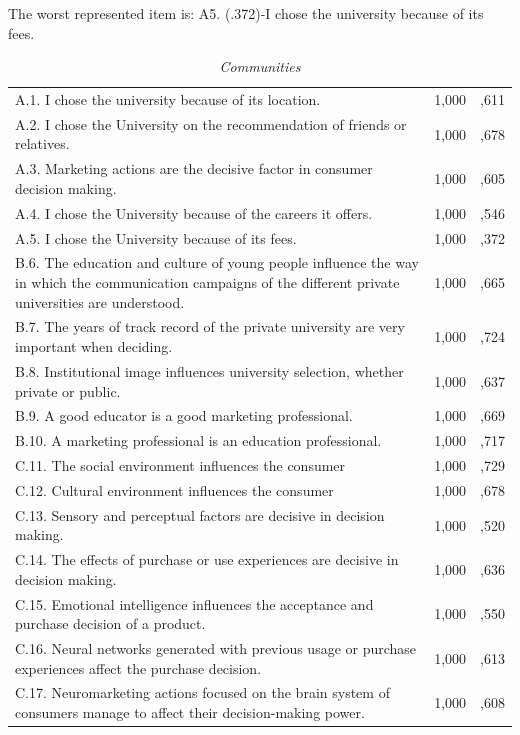 \documentclass[english]{textolivre}
\begin{document}
The worst represented item is: A5. (.372)-I chose the university because of its fees.

\begin{table}[h!]
\small
\centering
\caption{\textit{Communities}}
\begin{tabular}{p{}ll}
\toprule
A.1. I chose the university because of its location. & 1,000 & ,611 \\
A.2. I chose the University on the recommendation of friends or relatives. & 1,000 & ,678 \\
A.3. Marketing actions are the decisive factor in consumer decision making. & 1,000 & ,605 \\
A.4. I chose the University because of the careers it offers. & 1,000 & ,546 \\
A.5. I chose the University because of its fees. & 1,000 & ,372 \\
B.6. The education and culture of young people influence the way in which the communication campaigns of the different private universities are understood. & 1,000 & ,665 \\
B.7. The years of track record of the private university are very important when deciding. & 1,000 & ,724 \\
B.8. Institutional image influences university selection, whether private or public. & 1,000 & ,637 \\
B.9. A good educator is a good marketing professional. & 1,000 &	,669 \\
B.10. A marketing professional is an education professional. &	1,000 & ,717 \\
C.11. The social environment influences the consumer & 1,000 & ,729 \\
C.12. Cultural environment influences the consumer & 1,000 & ,678 \\
C.13. Sensory and perceptual factors are decisive in decision making. & 1,000 & ,520 \\
C.14. The effects of purchase or use experiences are decisive in decision making. & 1,000 & ,636 \\
C.15. Emotional intelligence influences the acceptance and purchase decision of a product. & 1,000 & ,550 \\
C.16. Neural networks generated with previous usage or purchase experiences affect the purchase decision. & 1,000 & ,613 \\
C.17. Neuromarketing actions focused on the brain system of consumers manage to affect their decision-making power.& 1,000 & ,608 \\

\end{tabular}
\end{table}
\end{document}
